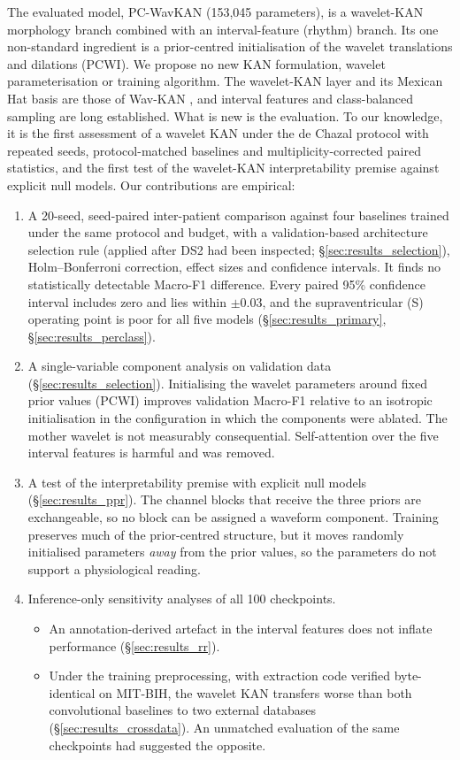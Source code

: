 \documentclass[preprint,12pt]{elsarticle}
\begin{document}
The evaluated model, PC-WavKAN (153,045 parameters), is a wavelet-KAN morphology branch combined with an interval-feature (rhythm) branch. Its one non-standard ingredient is a prior-centred initialisation of the wavelet translations and dilations (PCWI). We propose no new KAN formulation, wavelet parameterisation or training algorithm. The wavelet-KAN layer and its Mexican Hat basis are those of Wav-KAN \cite{bozorgasl_wavkan_2024}, and interval features and class-balanced sampling are long established. What is new is the evaluation. To our knowledge, it is the first assessment of a wavelet KAN under the de Chazal protocol with repeated seeds, protocol-matched baselines and multiplicity-corrected paired statistics, and the first test of the wavelet-KAN interpretability premise against explicit null models. Our contributions are empirical:
\begin{enumerate}
    \item A 20-seed, seed-paired inter-patient comparison against four baselines trained under the same protocol and budget, with a validation-based architecture selection rule (applied after DS2 had been inspected; \S\ref{sec:results_selection}), Holm--Bonferroni correction, effect sizes and confidence intervals. It finds no statistically detectable Macro-F1 difference. Every paired 95\% confidence interval includes zero and lies within $\pm0.03$, and the supraventricular (S) operating point is poor for all five models (\S\ref{sec:results_primary}, \S\ref{sec:results_perclass}).
    \item A single-variable component analysis on validation data (\S\ref{sec:results_selection}). Initialising the wavelet parameters around fixed prior values (PCWI) improves validation Macro-F1 relative to an isotropic initialisation in the configuration in which the components were ablated. The mother wavelet is not measurably consequential. Self-attention over the five interval features is harmful and was removed.
    \item A test of the interpretability premise with explicit null models (\S\ref{sec:results_ppr}). The channel blocks that receive the three priors are exchangeable, so no block can be assigned a waveform component. Training preserves much of the prior-centred structure, but it moves randomly initialised parameters \emph{away} from the prior values, so the parameters do not support a physiological reading.
    \item Inference-only sensitivity analyses of all 100 checkpoints.
    \begin{itemize}
        \item An annotation-derived artefact in the interval features does not inflate performance (\S\ref{sec:results_rr}).
        \item Under the training preprocessing, with extraction code verified byte-identical on MIT-BIH, the wavelet KAN transfers worse than both convolutional baselines to two external databases (\S\ref{sec:results_crossdata}). An unmatched evaluation of the same checkpoints had suggested the opposite.
    \end{itemize}
\end{enumerate}
\end{document}
